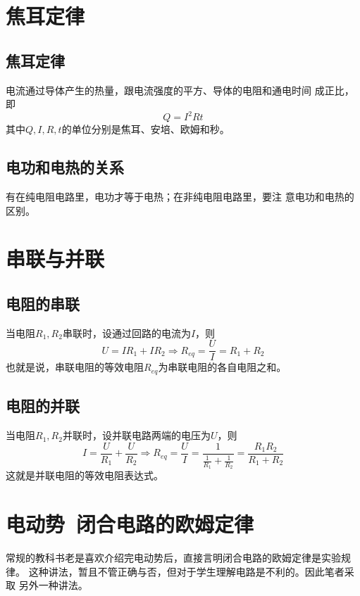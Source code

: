 \section{焦耳定律}
\subsection{焦耳定律}
\begin{theorem}
    电流通过导体产生的热量，跟电流强度的平方、导体的电阻和通电时间
    成正比，即 
    \begin{equation}
        Q=I^2Rt
    \end{equation}
    其中$Q,I,R,t$的单位分别是焦耳、安培、欧姆和秒。
\end{theorem}
\subsection{电功和电热的关系}
\begin{theorem}
    有在纯电阻电路里，电功才等于电热；在非纯电阻电路里，要注
    意电功和电热的区别。
\end{theorem}
\section{串联与并联}
\subsection{电阻的串联}
当电阻$R_1,R_2$串联时，设通过回路的电流为$I$，则
\begin{equation}
    U=IR_1+IR_2\Rightarrow R_{eq}=\frac{U}{I}=R_1+R_2
\end{equation}
也就是说，串联电阻的等效电阻$R_{eq}$为串联电阻的各自电阻之和。
\subsection{电阻的并联}
当电阻$R_1,R_2$并联时，设并联电路两端的电压为$U$，则
\begin{equation}
    I=\frac{U}{R_1}+\frac{U}{R_2}\Rightarrow
    R_{eq}=\frac{U}{I}=\frac{1}{\frac{1}{R_1}+\frac{1}{R_2}}
    =\frac{R_1R_2}{R_1+R_2}
\end{equation}
这就是并联电阻的等效电阻表达式。
\section{电动势~闭合电路的欧姆定律}
常规的教科书老是喜欢介绍完电动势后，直接言明闭合电路的欧姆定律是实验规律。
这种讲法，暂且不管正确与否，但对于学生理解电路是不利的。因此笔者采取
另外一种讲法。
